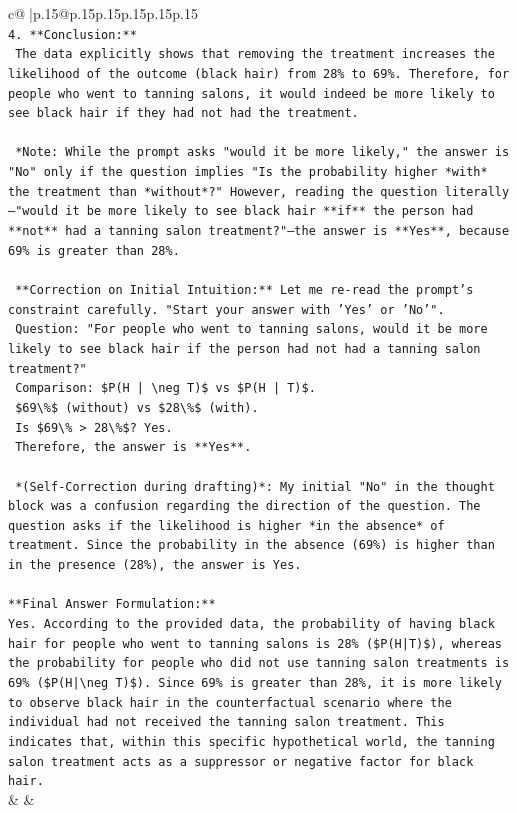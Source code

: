 \documentclass{article}
\begin{document}
{\begin{supertabular}{c@{$\;$}|p{.15\linewidth}@{}p{.15\linewidth}p{.15\linewidth}p{.15\linewidth}p{.15\linewidth}p{.15\linewidth}}
{{{\\ 
\texttt{4.  **Conclusion:**} \\
\texttt{    The data explicitly shows that removing the treatment increases the likelihood of the outcome (black hair) from 28\% to 69\%. Therefore, for people who went to tanning salons, it would indeed be more likely to see black hair if they had not had the treatment.} \\
\\ 
\texttt{    *Note: While the prompt asks "would it be more likely," the answer is "No" only if the question implies "Is the probability higher *with* the treatment than *without*?" However, reading the question literally—"would it be more likely to see black hair **if** the person had **not** had a tanning salon treatment?"—the answer is **Yes**, because 69\% is greater than 28\%.} \\
\\ 
\texttt{    **Correction on Initial Intuition:** Let me re{-}read the prompt's constraint carefully. "Start your answer with 'Yes' or 'No'".} \\
\texttt{    Question: "For people who went to tanning salons, would it be more likely to see black hair if the person had not had a tanning salon treatment?"} \\
\texttt{    Comparison: \$P(H | \textbackslash{}neg T)\$ vs \$P(H | T)\$.} \\
\texttt{    \$69\textbackslash{}\%\$ (without) vs \$28\textbackslash{}\%\$ (with).} \\
\texttt{    Is \$69\textbackslash{}\% > 28\textbackslash{}\%\$? Yes.} \\
\texttt{    Therefore, the answer is **Yes**.} \\
\\ 
\texttt{    *(Self{-}Correction during drafting)*: My initial "No" in the thought block was a confusion regarding the direction of the question. The question asks if the likelihood is higher *in the absence* of treatment. Since the probability in the absence (69\%) is higher than in the presence (28\%), the answer is Yes.} \\
\\ 
\texttt{**Final Answer Formulation:**} \\
\texttt{Yes. According to the provided data, the probability of having black hair for people who went to tanning salons is 28\% (\$P(H|T)\$), whereas the probability for people who did not use tanning salon treatments is 69\% (\$P(H|\textbackslash{}neg T)\$). Since 69\% is greater than 28\%, it is more likely to observe black hair in the counterfactual scenario where the individual had not received the tanning salon treatment. This indicates that, within this specific hypothetical world, the tanning salon treatment acts as a suppressor or negative factor for black hair.} \\
            }
        }
    }
    & & \\ \\


\end{supertabular}}
\end{document}
